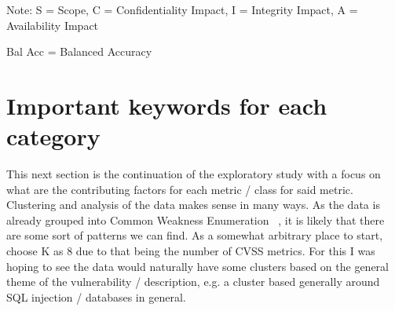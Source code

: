 \documentclass[12pt]{article}
\begin{document}
\begin{table}[H]
	\centering
	\caption{Comparison of the effects of the pre-trained models on the CVSS v3.1 dataset (Part 2).}
	\label{tab:distil_part2}
	\begin{tablenotes}
		\small
		\item Note: S = Scope, C = Confidentiality Impact, I = Integrity Impact, A = Availability
		Impact
		\item Bal Acc = Balanced Accuracy
	\end{tablenotes}
\end{table}

\section{Important keywords for each category}

This next section is the continuation of the exploratory study with a focus on what are the
contributing factors for each metric / class for said metric. Clustering and analysis of the data
makes sense in many ways. As the data is already grouped into Common Weakness Enumeration~\cite{CWE}
, it is likely that there are some sort of patterns we can find. As a somewhat arbitrary place to
start, choose K as 8 due to that being the number of CVSS metrics. For this I was hoping to see the
data would naturally have some clusters based on the general theme of the vulnerability /
description, e.g. a cluster based generally around SQL injection / databases in general.
\end{document}
